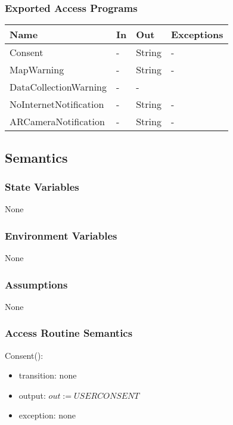 \documentclass[12pt, titlepage]{article}
\begin{document}
\subsubsection{Exported Access Programs}
\begin{center}
\begin{tabular}{p{4cm} p{2cm} p{4cm} p{4cm}}
\hline
\textbf{Name} & \textbf{In} & \textbf{Out} & \textbf{Exceptions} \\
\hline
Consent & - & String & - \\
MapWarning & - & String & - \\
DataCollectionWarning & - & -\\
NoInternetNotification & - & String & -\\
ARCameraNotification & - & String & -\\
\hline
\end{tabular}
\end{center}

\subsection{Semantics}

\subsubsection{State Variables}

None

\subsubsection{Environment Variables}

None

\subsubsection{Assumptions}

None

\subsubsection{Access Routine Semantics}

\noindent Consent():
\begin{itemize}
\item transition: none
\item output: $out := USERCONSENT$
\item exception: none
\end{itemize}
\end{document}
